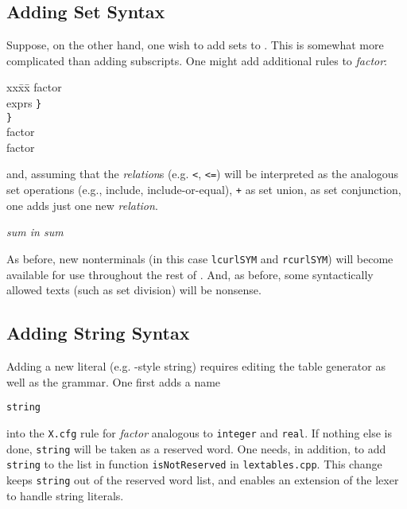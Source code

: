 \subsection{Adding Set Syntax}

Suppose, on the other hand, one wish to add sets to \xcom.  This is somewhat more complicated than adding subscripts.  One might add additional rules to {\em
factor}:

\begin{center}
\begin{em}
\begin{tabbing}
xx\=xx\=\kill
factor                           \\
\>{\tt\{} exprs {\tt\}}          \\
\>{\tt\{} {\tt\}}                \\
 factor              \\
 factor
\end{tabbing}
\end{em}
\end{center}

\noindent
and, assuming that the {\em relation}s (e.g. {\tt <}, {\tt <=}) will be interpreted as the analogous set operations (e.g., include, include-or-equal), {\tt +} as set union, {\tt *} as set conjunction, one adds just one new {\em relation}.

{\em sum {\rm in} sum}

As before, new nonterminals (in this case {\tt lcurlSYM} and {\tt rcurlSYM}) will become available for use throughout the rest of \xcom.  And, as before, some syntactically allowed texts (such as set division) will be nonsense.

\subsection{Adding String Syntax}

Adding a new literal (e.g. -style string) requires editing the table generator as well as the grammar.  One first adds a name

{\tt string}

\noindent
into the {\tt X.cfg} rule for {\em factor} analogous to {\tt integer} and {\tt real}.  If nothing else is done, {\tt string} will be taken as a reserved word.
One needs, in addition, to add {\tt string} to the list in function {\tt isNotReserved} in {\tt lextables.cpp}.  This change keeps {\tt string} out of the reserved word list, and enables an extension of the lexer to handle string literals.

